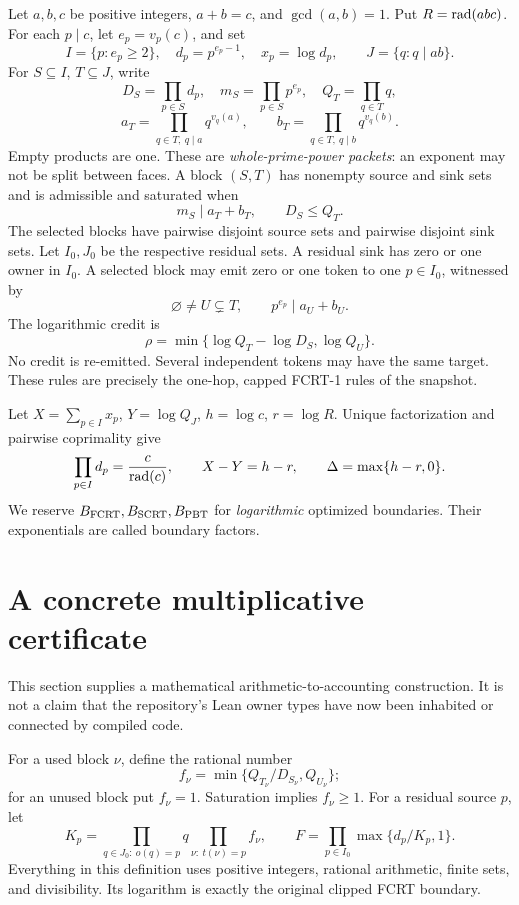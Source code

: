 Let \(a,b,c\) be positive integers, \(a+b=c\), and \(\gcd(a,b)=1\).
Put \(R=\operatorname{rad}(abc)\). For each \(p\mid c\), let \(e_p=v_p(c)\), and set
\[
 I=\{p:e_p\ge2\},\quad d_p=p^{e_p-1},\quad x_p=\log d_p,
 \qquad J=\{q:q\mid ab\}.
\]
For \(S\subseteq I\), \(T\subseteq J\), write
\[
 D_S=\prod_{p\in S}d_p,\quad m_S=\prod_{p\in S}p^{e_p},\quad
 Q_T=\prod_{q\in T}q,
\]
\[
 a_T=\prod_{q\in T,\ q\mid a}q^{v_q(a)},\qquad
 b_T=\prod_{q\in T,\ q\mid b}q^{v_q(b)}.
\]
Empty products are one. These are \emph{whole-prime-power packets}: an
exponent may not be split between faces. A block \((S,T)\) has nonempty
source and sink sets and is admissible and saturated when
\begin{equation}\label{fcrt:eq:block}
 m_S\mid a_T+b_T,\qquad D_S\le Q_T.
\end{equation}
The selected blocks have pairwise disjoint source sets and pairwise disjoint
sink sets. Let \(I_0,J_0\) be the respective residual sets. A residual sink
has zero or one owner in \(I_0\). A selected block may emit zero or one token
to one \(p\in I_0\), witnessed by
\begin{equation}\label{fcrt:eq:flag}
 \varnothing\ne U\subsetneq T,\qquad p^{e_p}\mid a_U+b_U.
\end{equation}
The logarithmic credit is
\[
 \rho=\min\{\log Q_T-\log D_S,\log Q_U\}.
\]
No credit is re-emitted. Several independent tokens may have the same target.
These rules are precisely the one-hop, capped FCRT-1 rules of the snapshot.

Let \(X=\sum_{p\in I}x_p\), \(Y=\log Q_J\), \(h=\log c\),
\(r=\log R\). Unique factorization and pairwise coprimality give
\begin{equation}\label{fcrt:eq:height}
 \prod_{p\in I}d_p=\frac{c}{\operatorname{rad}(c)},\qquad
 X-Y=h-r,\qquad \Delta=\max\{h-r,0\}.
\end{equation}
We reserve \(B_{\mathrm{FCRT}},B_{\mathrm{SCRT}},B_{\mathrm{PBT}}\) for \emph{logarithmic}
optimized boundaries. Their exponentials are called boundary factors.

\section{A concrete multiplicative certificate}
This section supplies a mathematical arithmetic-to-accounting construction.
It is not a claim that the repository's Lean owner types have now been
inhabited or connected by compiled code.

For a used block \(\nu\), define the rational number
\begin{equation}\label{fcrt:eq:creditfactor}
 f_\nu=\min\{Q_{T_\nu}/D_{S_\nu},Q_{U_\nu}\};
\end{equation}
for an unused block put \(f_\nu=1\). Saturation implies \(f_\nu\ge1\).
For a residual source \(p\), let
\[
 K_p=\prod_{q\in J_0:\ o(q)=p}q
       \prod_{\nu:\ t(\nu)=p}f_\nu,
 \qquad
 F=\prod_{p\in I_0}\max\{d_p/K_p,1\}.
\]
Everything in this definition uses positive integers, rational arithmetic,
finite sets, and divisibility. Its logarithm is exactly the original clipped
FCRT boundary.

